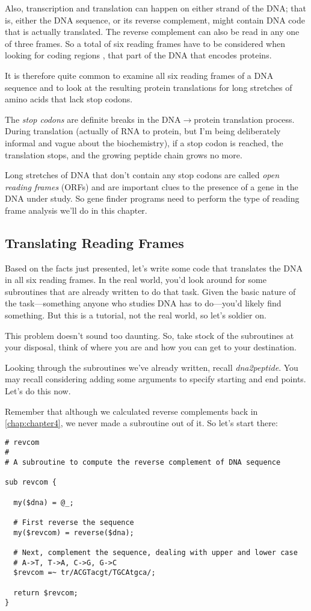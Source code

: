 Also, transcription and translation can happen on either strand of the DNA; that is, either the DNA sequence, or its reverse complement, might contain DNA code that is actually translated. The reverse complement can also be read in any one of three frames. So a total of six reading frames have to be considered when looking for coding regions , that part of the DNA that encodes proteins.

It is therefore quite common to examine all six reading frames of a DNA sequence and to look at the resulting protein translations for long stretches of amino acids that lack stop codons.

The \textit{stop codons} are definite breaks in the DNA$\rightarrow$protein translation process. During translation (actually of RNA to protein, but I'm being deliberately informal and vague about the biochemistry), if a stop codon is reached, the translation stops, and the growing peptide chain grows no more.

Long stretches of DNA that don't contain any stop codons are called \textit{open reading frames} (ORFs) and are important clues to the presence of a gene in the DNA under study. So gene finder programs need to perform the type of reading frame analysis we'll do in this chapter. 

\subsection{Translating Reading Frames}
Based on the facts just presented, let's write some code that translates the DNA in all six reading frames.  
In the real world, you'd look around for some subroutines that are already written to do that task. Given the basic nature of the task—something anyone who studies DNA has to do—you'd likely find something. But this is a tutorial, not the real world, so let's soldier on.

This problem doesn't sound too daunting. So, take stock of the subroutines at your disposal, think of where you are and how you can get
to your destination.

Looking through the subroutines we've already written, recall \textit{dna2peptide}. You may recall considering adding some arguments to specify starting and end points. Let's do this now.

Remember that although we calculated reverse complements back in \autoref{chap:chapter4}, we never made a subroutine out of it. So let's start there: 

\begin{lstlisting}
# revcom 
#
# A subroutine to compute the reverse complement of DNA sequence

sub revcom {

  my($dna) = @_;

  # First reverse the sequence
  my($revcom) = reverse($dna);

  # Next, complement the sequence, dealing with upper and lower case
  # A->T, T->A, C->G, G->C
  $revcom =~ tr/ACGTacgt/TGCAtgca/;

  return $revcom;
}
\end{lstlisting}

